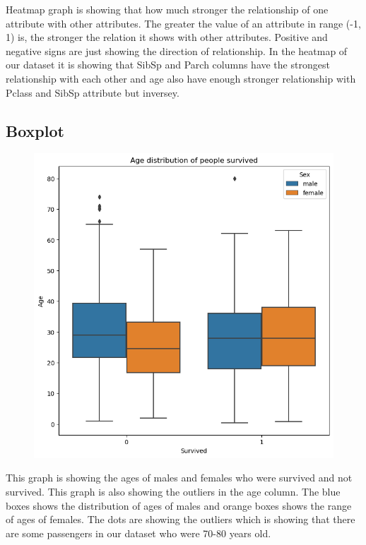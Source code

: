 \documentclass[a4paper, 12pt]{article}
\begin{document}
Heatmap graph is showing that how much stronger the relationship of one attribute with other attributes. The greater the value of an attribute in range (-1, 1) is, the stronger the relation it shows with other attributes. Positive and negative signs are just showing the direction of relationship. In the heatmap of our dataset it is showing that SibSp and Parch columns have the strongest relationship with each other and age also have enough stronger relationship with Pclass and SibSp attribute but inversey.

\subsection*{Boxplot}

\begin{figure}[h]
  \centering
  \includegraphics[width=13cm]{boxplot.png}
\end{figure}

This graph is showing the ages of males and females who were survived and not survived. This graph is also showing the outliers in the age column. The blue boxes shows the distribution of ages of males and orange boxes shows the range of ages of females. The dots are showing the outliers which is showing that there are some passengers in our dataset who were 70-80 years old.
\end{document}
